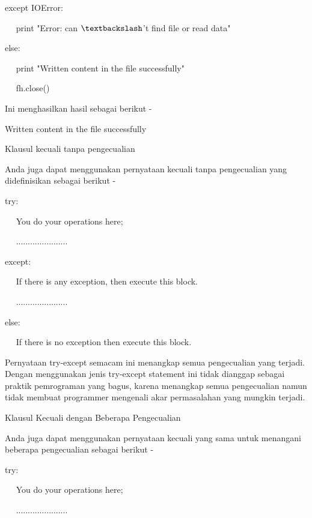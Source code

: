 except IOError: \par
~~ print "Error: can $  \textbackslash  $'t find file or read data" \par
else: \par
~~ print "Written content in the file successfully" \par
~~ fh.close() \par
\vspace{12pt}
Ini menghasilkan hasil sebagai berikut - \par
\vspace{12pt}
Written content in the file successfully \par
\vspace{12pt}
Klausul kecuali tanpa pengecualian \par
\vspace{12pt}
Anda juga dapat menggunakan pernyataan kecuali tanpa pengecualian yang didefinisikan sebagai berikut - \par
\vspace{12pt}
try: \par
~~ You do your operations here; \par
~~ ...................... \par
except: \par
~~ If there is any exception, then execute this block. \par
~~ ...................... \par
else: \par
~~ If there is no exception then execute this block.  \par
\vspace{12pt}
\vspace{12pt}
Pernyataan try-except semacam ini menangkap semua pengecualian yang terjadi. Dengan menggunakan jenis try-except statement ini tidak dianggap sebagai praktik pemrograman yang bagus, karena menangkap semua pengecualian namun tidak membuat programmer mengenali akar permasalahan yang mungkin terjadi. \par
Klausul Kecuali dengan Beberapa Pengecualian \par
\vspace{12pt}
Anda juga dapat menggunakan pernyataan kecuali yang sama untuk menangani beberapa pengecualian sebagai berikut - \par
\vspace{12pt}
try: \par
~~ You do your operations here; \par
~~ ...................... \par
